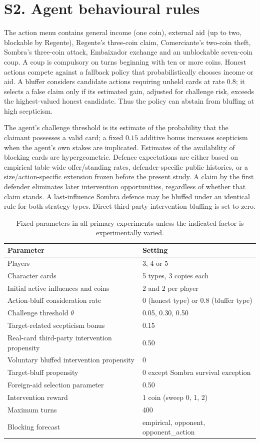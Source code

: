 \documentclass[10pt,a4paper]{article}
\begin{document}
\section*{S2. Agent behavioural rules}
The action menu contains general income (one coin), external aid (up to two, blockable by Regente), Regente's three-coin claim, Comerciante's two-coin theft, Sombra's three-coin attack, Embaixador exchange and an unblockable seven-coin coup. A coup is compulsory on turns beginning with ten or more coins. Honest actions compete against a fallback policy that probabilistically chooses income or aid. A bluffer considers candidate actions requiring unheld cards at rate $0.8$; it selects a false claim only if its estimated gain, adjusted for challenge risk, exceeds the highest-valued honest candidate. Thus the policy can abstain from bluffing at high scepticism.

The agent's challenge threshold is its estimate of the probability that the claimant possesses a valid card; a fixed $0.15$ additive bonus increases scepticism when the agent's own stakes are implicated. Estimates of the availability of blocking cards are hypergeometric. Defence expectations are either based on empirical table-wide offer/standing rates, defender-specific public histories, or a size/action-specific extension frozen before the present study. A claim by the first defender eliminates later intervention opportunities, regardless of whether that claim stands. A last-influence Sombra defence may be bluffed under an identical rule for both strategy types. Direct third-party intervention bluffing is set to zero.

\begin{table}[htbp]\centering\small
\caption{Fixed parameters in all primary experiments unless the indicated factor is experimentally varied.}
\begin{tabular}{p{}p{}}\toprule
Parameter & Setting \\ \midrule
Players & 3, 4 or 5\\
Character cards & 5 types, 3 copies each\\
Initial active influences and coins & 2 and 2 per player\\
Action-bluff consideration rate & 0 (honest type) or 0.8 (bluffer type)\\
Challenge threshold $\theta$ & 0.05, 0.30, 0.50\\
Target-related scepticism bonus & 0.15\\
Real-card third-party intervention propensity & 0.50\\
Voluntary bluffed intervention propensity & 0\\
Target-bluff propensity & 0 except Sombra survival exception\\
Foreign-aid selection parameter & 0.50\\
Intervention reward & 1 coin (sweep 0, 1, 2)\\
Maximum turns & 400\\
Blocking forecast & empirical, opponent, opponent\_action\\
\bottomrule\end{tabular}
\end{table}
\end{document}
